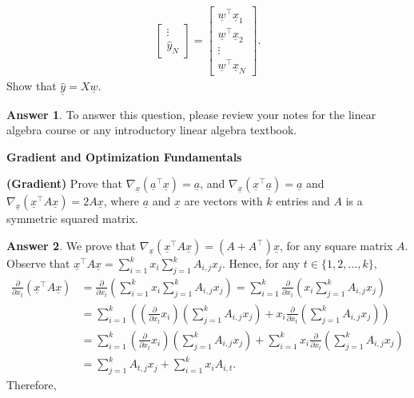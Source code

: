 \documentclass{article}
\renewcommand{\vec}[1]{\underline{#1}}
\newcommand{\vecw}{\vec{w}}
\newcommand{\vecx}{\vec{x}}
\theoremstyle{definition}
\newtheorem*{answer}{Answer}
\begin{document}
\begin{question}[start=0]
\begin{question}
\begin{align*}
\begin{bmatrix}
				\vdots \\
				\hat{y}_N
			\end{bmatrix} = \begin{bmatrix}
				\vecw^\top \vecx_{1} \\
				\vecw^\top \vecx_{2} \\
				\vdots \\
				\vecw^\top \vecx_{N}
			\end{bmatrix}.
		\end{align*}
		Show that $\underline{\hat{y}} = X\vecw$.
		\begin{answer}
			To answer this question, please review your notes for the linear algebra course or any introductory linear algebra textbook.
		\end{answer}
	\end{question}
	\item \textbf{Gradient and Optimization Fundamentals}
	\begin{question}
		\item \textbf{(Gradient)} Prove that $\nabla_{\!\vecx}(\vec{a}^\top \vecx) = \vec{a}$, and $\nabla_{\!\vecx}(\vec{x}^\top \vec{a}) = \vec{a}$ and $\nabla_{\!\vecx}(\vecx^\top A \vecx)=2A\vecx$, where $\vec{a}$ and $\vecx$ are vectors with $k$ entries and $A$ is a symmetric squared matrix.
		\begin{answer}
			 We prove that $\nabla_{\!\vecx}(\vecx^\top A \vecx)=(A+A^\top)\vecx$, for any square matrix $A$. Observe that $\vecx^\top A \vecx = \sum\limits_{i=1}^{k}  x_i \sum\limits_{j=1}^{k} A_{i,j} x_j$. Hence, for any $t \in \{1, 2, \ldots, k\}$,
			\begin{align*}
				{\frac {\partial }{\partial x_t}}(\vecx^\top A \vecx)  &= {\frac {\partial }{\partial x_t}}(\sum\limits_{i=1}^{k}  x_i \sum\limits_{j=1}^{k} A_{i,j} x_j) = {\sum\limits_{i=1}^{k}\frac {\partial }{\partial x_t}(x_i \sum\limits_{j=1}^{k} A_{i,j} x_j)}\\
				&= \sum\limits_{i=1}^{k}\left((\frac {\partial }{\partial x_t}x_i)(\sum\limits_{j=1}^{k} A_{i,j} x_j) + x_i \frac {\partial }{\partial x_t}(\sum\limits_{j=1}^{k} A_{i,j} x_j)\right)\\
				&= {\sum\limits_{i=1}^{k}(\frac {\partial }{\partial x_t}x_i)(\sum\limits_{j=1}^{k} A_{i,j} x_j)} + \sum\limits_{i=1}^{k} x_i \frac {\partial }{\partial x_t}(\sum\limits_{j=1}^{k} A_{i,j} x_j)\\
				&= {\sum\limits_{j=1}^{k} A_{t,j} x_j} + \sum\limits_{i=1}^{k} x_i A_{i, t}.
			\end{align*}
			Therefore, 

\end{answer}
\end{question}
\end{question}
\end{document}
